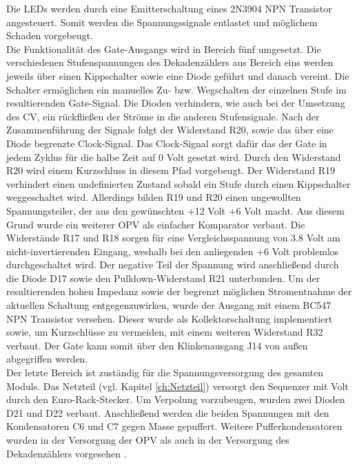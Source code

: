 Die LEDs werden durch eine Emitterschaltung eines 2N3904 NPN Transistor angesteuert. Somit werden die Spannungssignale entlastet und möglichem Schaden vorgebeugt.\\
Die Funktionalität des Gate-Ausgangs wird in Bereich fünf umgesetzt. Die verschiedenen Stufenspannungen des Dekadenzählers aus Bereich eins werden jeweils über einen Kippschalter sowie eine Diode geführt und danach vereint. Die Schalter ermöglichen ein manuelles Zu- bzw. Wegschalten der einzelnen Stufe im resultierenden Gate-Signal. Die Dioden verhindern, wie auch bei der Umsetzung des CV, ein rückfließen der Ströme in die anderen Stufensignale. Nach der Zusammenführung der Signale folgt der Widerstand R20, sowie das über eine Diode begrenzte Clock-Signal. Das Clock-Signal sorgt dafür das der Gate in jedem Zyklus für die halbe Zeit auf 0 Volt gesetzt wird. Durch den Widerstand R20 wird einem Kurzschluss in diesem Pfad vorgebeugt. Der Widerstand R19 verhindert einen undefinierten Zustand sobald ein Stufe durch einen Kippschalter weggeschaltet wird. Allerdings bilden R19 und R20 einen ungewollten Spannungsteiler, der aus den gewünschten +12 Volt +6 Volt macht. Aus diesem Grund wurde ein weiterer OPV als einfacher Komparator verbaut. Die Widerstände R17 und R18 sorgen für eine Vergleichsspannung von 3.8 Volt am nicht-invertierenden Eingang, weshalb bei den anliegenden +6 Volt problemlos durchgeschaltet wird. Der negative Teil der Spannung wird anschließend durch die Diode D17 sowie den Pulldown-Widerstand R21 unterbunden. Um der resultierenden hohen Impedanz sowie der begrenzt möglichen Stromentnahme der aktuellen Schaltung entgegenzuwirken, wurde der Ausgang mit einem BC547 NPN Transistor versehen. Dieser wurde als Kollektorschaltung implementiert sowie, um Kurzschlüsse zu vermeiden, mit einem weiteren Widerstand R32 verbaut. Der Gate kann somit über den Klinkenausgang J14 von außen abgegriffen werden.\\
Der letzte Bereich ist zuständig für die Spannungsversorgung des gesamten Moduls. Das Netzteil (vgl. Kapitel \ref{ch:Netzteil}) versorgt den Sequenzer mit  Volt durch den Euro-Rack-Stecker. Um Verpolung vorzubeugen, wurden zwei Dioden D21 und D22 verbaut. Anschließend werden die beiden Spannungen mit den Kondensatoren C6 und C7 gegen Masse gepuffert. Weitere Pufferkondensatoren wurden in der Versorgung der OPV als auch in der Versorgung des Dekadenzählers vorgesehen \cite{seq_manual}.

